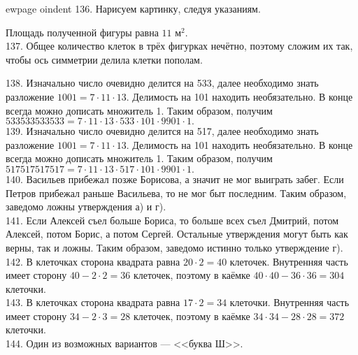ewpage
oindent
136. Нарисуем картинку, следуя указаниям.
\begin{center}
\begin{figure}[ht!]
\end{figure}
\end{center}
Площадь полученной фигуры равна $11\text{ м}^2.$\\
137. Общее количество клеток в трёх фигурках нечётно, поэтому сложим их так, чтобы ось симметрии делила клетки пополам.
\begin{center}
\begin{figure}[ht!]
\end{figure}
\end{center}
138. Изначально число очевидно делится на 533, далее необходимо знать разложение $1001=7\cdot11\cdot13.$ Делимость на 101 находить необязательно. В конце всегда можно дописать множитель 1. Таким образом, получим $533533533533=7\cdot11\cdot13\cdot533\cdot101\cdot9901\cdot1.$\\
139. Изначально число очевидно делится на 517, далее необходимо знать разложение $1001=7\cdot11\cdot13.$ Делимость на 101 находить необязательно. В конце всегда можно дописать множитель 1. Таким образом, получим $517517517517=7\cdot11\cdot13\cdot517\cdot101\cdot9901\cdot1.$\\
140. Васильев прибежал позже Борисова, а значит не мог выиграть забег. Если Петров прибежал раньше Васильева, то не мог быт последним. Таким образом, заведомо ложны утверждения а) и г).\\
141. Если Алексей съел больше Бориса, то больше всех съел Дмитрий, потом Алексей, потом Борис, а потом Сергей. Остальные утверждения могут быть как верны, так и ложны. Таким образом, заведомо истинно только утверждение г).\\
142. В клеточках сторона квадрата равна $20\cdot2=40$ клеточек. Внутренняя часть имеет сторону $40-2\cdot2=36$ клеточек, поэтому в каёмке $40\cdot40-36\cdot36=304$ клеточки.\\
143. В клеточках сторона квадрата равна $17\cdot2=34$ клеточки. Внутренняя часть имеет сторону $34-2\cdot3=28$ клеточек, поэтому в каёмке $34\cdot34-28\cdot28=372$ клеточки.\\
144. Один из возможных вариантов --- <<буква Ш>>.
\begin{center}
\begin{figure}[ht!]
\end{figure}
\end{center}
